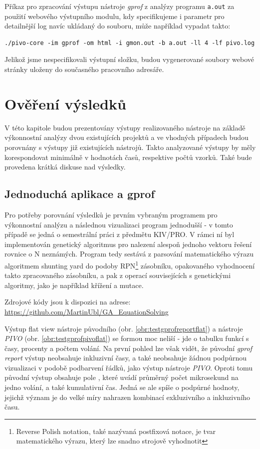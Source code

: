 \documentclass[czech,BP]{thesiskiv}
\begin{document}
Příkaz pro zpracování výstupu nástroje \emph{gprof} z analýzy programu \texttt{a.out} za použití webového výstupního modulu, kdy specifikujeme i parametr pro detailnější log navíc ukládaný do souboru, může například vypadat takto:

\lstset{escapechar=@,style=custombash}
\begin{lstlisting}
./pivo-core -im gprof -om html -i gmon.out -b a.out -ll 4 -lf pivo.log
\end{lstlisting}

Jelikož jsme nespecifikovali výstupní složku, budou vygenerované soubory webové stránky uloženy do současného pracovního adresáře.



\chapter{Ověření výsledků}

V této kapitole budou prezentovány výstupy realizovaného nástroje na základě výkonnostní analýzy dvou existujících projektů a ve vhodných případech budou porovnány s výstupy již existujících nástrojů. Takto analyzované výstupy by měly korespondovat minimálně v hodnotách časů, respektive počtů vzorků. Také bude provedena krátká diskuse nad výsledky.

\section{Jednoduchá aplikace a gprof}

Pro potřeby porovnání výsledků je prvním vybraným programem pro výkonnostní analýzu a následnou vizualizaci program jednodušší - v tomto případě se jedná o semestrální práci z předmětu KIV/PRO. V rámci ní byl implementován genetický algoritmus pro nalezení alespoň jednoho vektoru řešení rovnice o N neznámých. Program tedy sestává z parsování matematického výrazu algoritmem shunting yard do podoby RPN\footnote{Reverse Polish notation, také nazývaná postfixová notace, je tvar matematického výrazu, který lze snadno strojově vyhodnotit} zásobníku, opakovaného vyhodnocení takto zpracovaného zásobníku, a pak z operací souvisejících s genetickými algoritmy, jako je například křížení a mutace.

Zdrojové kódy jsou k dispozici na adrese:\\
\url{https://github.com/MartinUbl/GA_EquationSolving}

Výstup flat view nástroje původního (obr. \ref{obr:testgprofreportflat}) a nástroje \emph{PIVO} (obr. \ref{obr:testgprofpivoflat}) se formou moc neliší - jde o tabulku funkcí s časy, procenty a počtem volání. Na první pohled lze však vidět, že původní \emph{gprof report} výstup neobsahuje inkluzivní časy, a také neobsahuje žádnou podpůrnou vizualizaci v podobě podbarvení řádků, jako výstup nástroje \emph{PIVO}. Oproti tomu původní výstup obsahuje pole , které uvádí průměrný počet mikrosekund na jedno volání, a také kumulativní čas. Jedná se ale spíše o podpůrné hodnoty, jejichž význam je do velké míry nahrazen kombinací exkluzivního a inkluzivního času.
\end{document}
